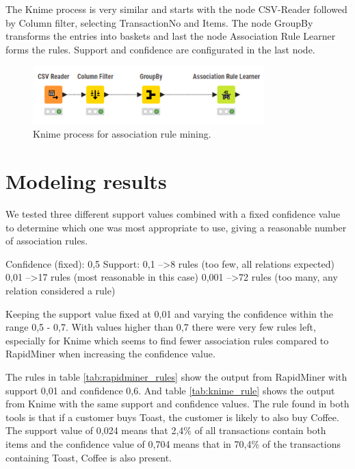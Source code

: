 The Knime process is very similar and starts with the node CSV-Reader followed by Column filter,
selecting TransactionNo and Items. The node GroupBy transforms the entries into baskets and last
the node Association Rule Learner forms the rules. Support and confidence are configurated in the
last node.

\begin{figure}[H]
\centering
\includegraphics[width=0.8\textwidth]{figures/AssociationRulesKnimeProcess.png}
\caption{Knime process for association rule mining.}
\label{fig:KnimeProcess}
\end{figure}

\section{Modeling results}
We tested three different support values combined with a fixed confidence value to determine which
one was most appropriate to use, giving a reasonable number of association rules.

Confidence (fixed): 0,5
Support:
0,1 --\textgreater 8 rules (too few, all relations expected)
0,01 --\textgreater 17 rules (most reasonable in this case)
0,001 --\textgreater 72 rules (too many, any relation considered a rule)

Keeping the support value fixed at 0,01 and varying the confidence within the range 0,5 - 0,7.
With values higher than 0,7 there were very few rules left, especially for Knime which seems to
find fewer association rules compared to RapidMiner when increasing the confidence value.

The rules in table \ref{tab:rapidminer_rules} show the output from RapidMiner with
support 0,01 and confidence 0,6. And table \ref{tab:knime_rule} shows the output from Knime with
the same support and confidence values. The rule found in both tools is that if a customer buys
Toast, the customer is likely to also buy Coffee. The support value of 0,024 means that 2,4\%
of all transactions contain both items and the confidence value of 0,704 means that in 70,4\%
of the transactions containing Toast, Coffee is also present.

